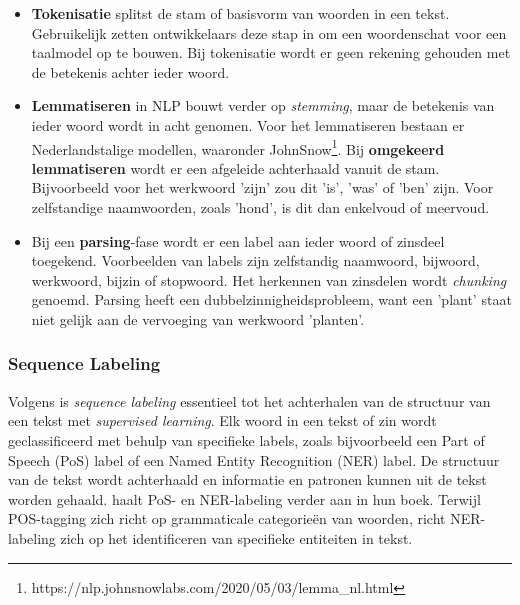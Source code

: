 \begin{itemize}
	\item \textbf{Tokenisatie} splitst de stam of basisvorm van woorden in een tekst. Gebruikelijk zetten ontwikkelaars deze stap in om een woordenschat voor een taalmodel op te bouwen. Bij tokenisatie wordt er geen rekening gehouden met de betekenis achter ieder woord.
	\item \textbf{Lemmatiseren} in NLP bouwt verder op \textit{stemming}, maar de betekenis van ieder woord wordt in acht genomen. Voor het lemmatiseren bestaan er Nederlandstalige modellen, waaronder JohnSnow\footnote{https://nlp.johnsnowlabs.com/2020/05/03/lemma\_nl.html}. Bij \textbf{omgekeerd lemmatiseren} wordt er een afgeleide achterhaald vanuit de stam. Bijvoorbeeld voor het werkwoord 'zijn' zou dit 'is', 'was' of 'ben' zijn. Voor zelfstandige naamwoorden, zoals 'hond', is dit dan enkelvoud of meervoud.
	\item Bij een \textbf{parsing}-fase wordt er een label aan ieder woord of zinsdeel toegekend. Voorbeelden van labels zijn zelfstandig naamwoord, bijwoord, werkwoord, bijzin of stopwoord. Het herkennen van zinsdelen wordt \textit{chunking} genoemd. Parsing heeft een dubbelzinnigheidsprobleem, want een 'plant' staat niet gelijk aan de vervoeging van werkwoord 'planten'.
\end{itemize}

\subsubsection{Sequence Labeling}

Volgens \textcite{Eisenstein2019} is \textit{sequence labeling} essentieel tot het achterhalen van de structuur van een tekst met \textit{supervised learning}. Elk woord in een tekst of zin wordt geclassificeerd met behulp van specifieke labels, zoals bijvoorbeeld een Part of Speech (PoS) label of een Named Entity Recognition (NER) label. De structuur van de tekst wordt achterhaald en informatie en patronen kunnen uit de tekst worden gehaald. \textcite{Jurafsky2014} haalt PoS- en NER-labeling verder aan in hun boek. Terwijl POS-tagging zich richt op grammaticale categorieën van woorden, richt NER-labeling zich op het identificeren van specifieke entiteiten in tekst. 

